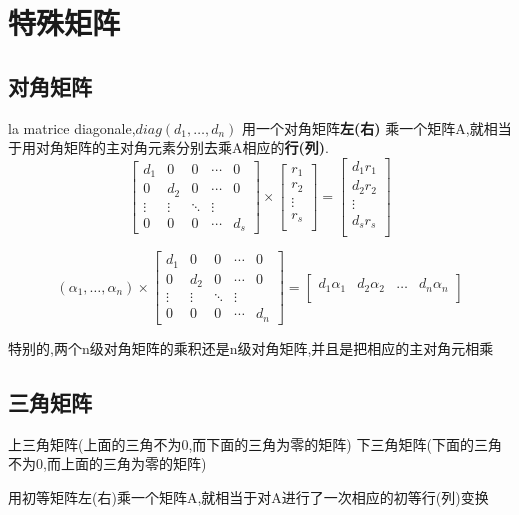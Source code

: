 \documentclass{book}
\begin{document}
\section{特殊矩阵}
\subsection{对角矩阵}
la matrice diagonale,$diag(d_1,\ldots,d_n)$ \newline
用一个对角矩阵{\bf 左(右) }乘一个矩阵A,就相当于用对角矩阵的主对角元素分别去乘A相应的{\bf 行(列)}.
$$
\begin{bmatrix}
  d_1 & 0  & 0 & \cdots & 0 \\
  0   & d_2 & 0 & \cdots & 0 \\
  \vdots & \vdots & \ddots & \vdots \\
  0 & 0 & 0 & \cdots & d_s
\end{bmatrix}
\times
\begin{bmatrix}
  r_1  \\
  r_2 \\
  \vdots \\
  r_s \\
\end{bmatrix}
=
\begin{bmatrix}
  d_1 r_1  \\
  d_2 r_2 \\
  \vdots \\
  d_s r_s \\
\end{bmatrix}
$$

$$
(\alpha_1,\ldots,\alpha_n)
\times
\begin{bmatrix}
  d_1 & 0  & 0 & \cdots & 0 \\
  0   & d_2 & 0 & \cdots & 0 \\
  \vdots & \vdots & \ddots & \vdots \\
  0 & 0 & 0 & \cdots & d_n
\end{bmatrix}
=
\begin{bmatrix}
  d_1 \alpha_1 & d_2 \alpha_2 & \dots & d_n \alpha_n \\
\end{bmatrix}
$$

特别的,两个n级对角矩阵的乘积还是n级对角矩阵,并且是把相应的主对角元相乘

\subsection{三角矩阵}
\noindent
上三角矩阵(上面的三角不为0,而下面的三角为零的矩阵) \newline
下三角矩阵(下面的三角不为0,而上面的三角为零的矩阵)
\begin{note}
  用初等矩阵左(右)乘一个矩阵A,就相当于对A进行了一次相应的初等行(列)变换
\end{note}
\end{document}
